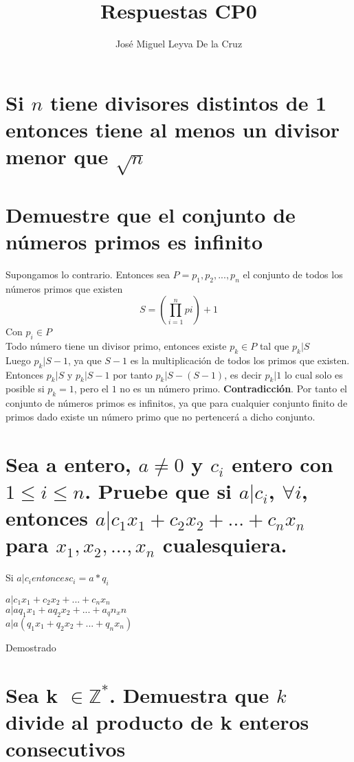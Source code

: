 \documentclass[10pt,a4paper]{article}
\author{Jos\'e Miguel Leyva De la Cruz}
\title{Respuestas CP0}
\begin{document}
\section{Si $n$ tiene divisores distintos de 1 entonces tiene al menos un divisor menor que $\sqrt{n}$}
\section{Demuestre que el conjunto de n\'umeros primos es infinito}
Supongamos lo contrario. Entonces sea $P = {p_1, p_2,...,p_n}$ el conjunto de todos los n\'umeros primos que existen
\large
\begin{equation*}
S = (\prod\limits_{i = 1}^{n} pi) + 1
\end{equation*}
\normalsize
Con $p_i \in P$\\
Todo n\'umero tiene un divisor primo, entonces existe $p_k \in P$ tal que $p_k | S$\\
Luego $p_k | S - 1$, ya que $S - 1$ es la multiplicaci\'on de todos los primos que existen. Entonces $p_k | S$ y $p_k | S - 1$ por tanto $p_k | S - (S - 1)$, es decir $p_k | 1$ lo cual solo es posible si $p_k = 1$, pero el $1$ no es un n\'umero primo. \textbf{Contradicci\'on}.
Por tanto el conjunto de n\'umeros primos es infinitos, ya que para cualquier conjunto finito de primos dado existe un n\'umero primo que no pertencer\'a a dicho conjunto.

\section{Sea a entero, $a \neq 0$ y $c_i$ entero con $1 \leq i \leq n$. Pruebe que si $a|c_i$, $\forall i$, entonces $a | c_1x_1 + c_2x_2 +...+c_nx_n$ para $x_1, x_2,...,x_n$ cualesquiera.}

Si $a|c_i entonces c_i = a * q_i$\\
\large
\begin{center}
$a |  c_1x_1 + c_2x_2 +...+c_nx_n$\\
$a | aq_1x_1 + aq_2x_2 +...+ a_qn_xn$\\
$a | a(q_1x_1 + q_2x_2+...+q_nx_n)$
\end{center}
\normalsize
Demostrado

\section{Sea k $\in \mathbb{Z^*}$. Demuestra que $k$ divide al producto de k enteros consecutivos}
\end{document}
